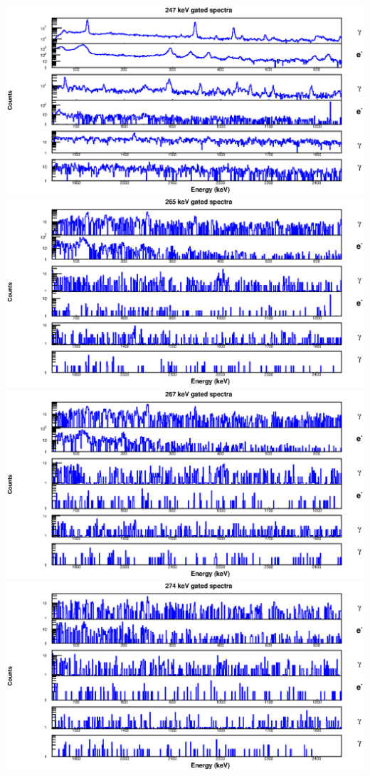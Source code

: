 \begin{landscape}
\includegraphics[scale=1.2]{154Gd_Appendix/247_combined.eps}
\includegraphics[scale=1.2]{154Gd_Appendix/265_combined.eps}
\includegraphics[scale=1.2]{154Gd_Appendix/267_combined.eps}
\includegraphics[scale=1.2]{154Gd_Appendix/274_combined.eps}

\end{landscape}
